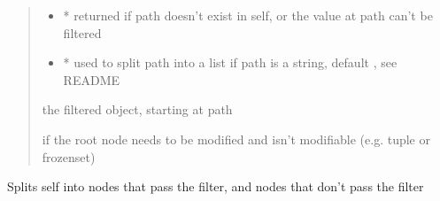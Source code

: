 \documentclass[a4paper,10pt,english]{sphinxmanual}
\begin{document}
\begin{fulllineitems}
\begin{fulllineitems}
\begin{quote}
\begin{description}
\begin{itemize}
\item {}
\sphinxAtStartPar
{} \textendash{} * returned if path doesn’t exist in self, or the value at path can’t be filtered

\item {}
\sphinxAtStartPar
{} \textendash{} * used to split path into a list if path is a string, default , see README

\end{itemize}

\sphinxAtStartPar
the filtered object, starting at path

\sphinxAtStartPar
{} \textendash{} if the root node needs to be modified and isn’t modifiable (e.g. tuple or frozenset)

\end{description}\end{quote}

\end{fulllineitems}


\begin{fulllineitems}
\label{\detokenize{fagus:fagus.Fagus.split}}
\pysigstartsignatures
{}
\pysigstopsignatures
\sphinxAtStartPar
Splits self into nodes that pass the filter, and nodes that don’t pass the filter


\end{fulllineitems}
\end{fulllineitems}
\end{document}
